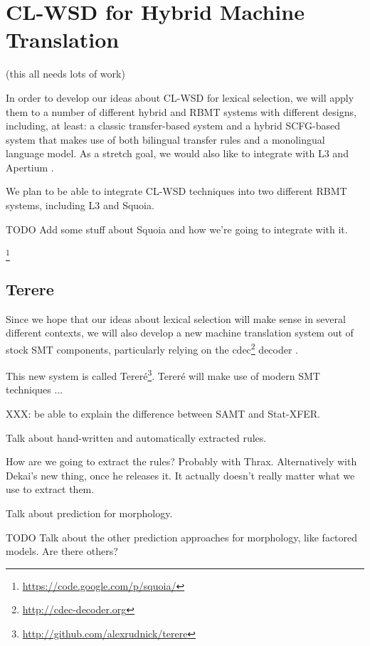 \section{CL-WSD for Hybrid Machine Translation}

(this all needs lots of work)

In order to develop our ideas about CL-WSD for lexical selection, we will apply
them to a number of different hybrid and RBMT systems with different designs,
including, at least: a classic transfer-based system and a hybrid SCFG-based
system that makes use of both bilingual transfer rules and a monolingual
language model. As a stretch goal, we would also like to integrate with L3
\cite{gasser:sxdg} and Apertium \cite{Forcada_theapertium}.

We plan to be able to integrate CL-WSD techniques into two different RBMT
systems, including L3 and Squoia.

TODO Add some stuff about Squoia and how we're going to integrate with it.
\cite{riosgonzales-gohring:2013:HyTra}

\footnote{\url{https://code.google.com/p/squoia/}}



\subsection{Terere}

Since we hope that our ideas about lexical selection will make sense in several
different contexts, we will also develop a new machine translation system out
of stock SMT components, particularly relying on the
cdec\footnote{\url{http://cdec-decoder.org}} decoder \cite{Dyer_etal_2010}.


\cite{hutchins1992introduction}

This new system is called
Tereré\footnote{\url{http://github.com/alexrudnick/terere}}. Tereré will make
use of modern SMT techniques ...

XXX: be able to explain the difference between SAMT and Stat-XFER.

Talk about hand-written and automatically extracted rules.

How are we going to extract the rules? Probably with Thrax. Alternatively with
Dekai's new thing, once he releases it. It actually doesn't really matter what
we use to extract them.

Talk about prediction for morphology.
\cite{toutanova-suzuki-ruopp:2008:ACLMain}

TODO Talk about the other prediction approaches for morphology, like factored
models. Are there others?

